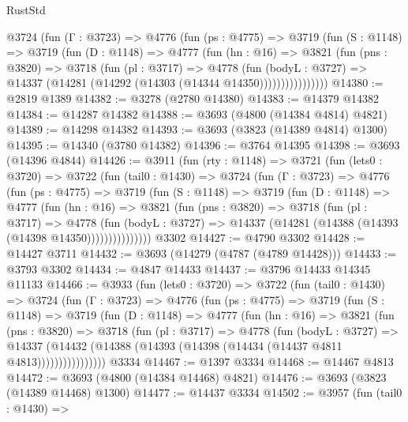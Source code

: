 \begin{lexlean}{RustStd}
\begin{coremodule}
          @3724
            (fun (Γ : @3723) =>
            @4776
              (fun (ps : @4775) =>
              @3719
                (fun (S : @1148) =>
                @3719
                  (fun (D : @1148) =>
                  @4777
                    (fun (hn : @16) =>
                    @3821
                      (fun (pns : @3820) =>
                      @3718
                        (fun (pl : @3717) =>
                        @4778
                          (fun (bodyL : @3727) =>
                          @14337 (@14281 (@14292 (@14303 (@14344 @14350))))))))))))))))
@14380 := @2819 @1389
@14382 := @3278 (@2780 @14380)
@14383 := @14379 @14382
@14384 := @14287 @14382
@14388 := @3693 (@4800 (@14384 @4814) @4821)
@14389 := @14298 @14382
@14393 := @3693 (@3823 (@14389 @4814) @1300)
@14395 := @14340 (@3780 @14382)
@14396 := @3764 @14395
@14398 := @3693 (@14396 @4844)
@14426 := @3911
    (fun (rty : @1148) =>
    @3721
      (fun (lets0 : @3720) =>
      @3722
        (fun (tail0 : @1430) =>
        @3724
          (fun (Γ : @3723) =>
          @4776
            (fun (ps : @4775) =>
            @3719
              (fun (S : @1148) =>
              @3719
                (fun (D : @1148) =>
                @4777
                  (fun (hn : @16) =>
                  @3821
                    (fun (pns : @3820) =>
                    @3718
                      (fun (pl : @3717) =>
                      @4778
                        (fun (bodyL : @3727) =>
                        @14337 (@14281 (@14388 (@14393 (@14398 @14350)))))))))))))))
    @3302
@14427 := @4790 @3302
@14428 := @14427 @3711
@14432 := @3693 (@14279 (@4787 (@4789 @14428)))
@14433 := @3793 @3302
@14434 := @4847 @14433
@14437 := @3796 @14433 @14345 @11133
@14466 := @3933
    (fun (lets0 : @3720) =>
    @3722
      (fun (tail0 : @1430) =>
      @3724
        (fun (Γ : @3723) =>
        @4776
          (fun (ps : @4775) =>
          @3719
            (fun (S : @1148) =>
            @3719
              (fun (D : @1148) =>
              @4777
                (fun (hn : @16) =>
                @3821
                  (fun (pns : @3820) =>
                  @3718
                    (fun (pl : @3717) =>
                    @4778
                      (fun (bodyL : @3727) =>
                      @14337
                        (@14432 (@14388 (@14393 (@14398 (@14434 (@14437 @4811 @4813))))))))))))))))
    @3334
@14467 := @1397 @3334
@14468 := @14467 @4813
@14472 := @3693 (@4800 (@14384 @14468) @4821)
@14476 := @3693 (@3823 (@14389 @14468) @1300)
@14477 := @14437 @3334
@14502 := @3957
    (fun (tail0 : @1430) =>

\end{coremodule}
\end{lexlean}
